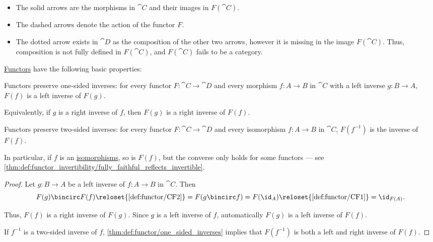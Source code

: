 \begin{example}
\begin{thmenum}
    \begin{itemize}
      \item The solid arrows are the morphisms in \( \cat{C} \) and their images in \( F(\cat{C}) \).
      \item The dashed arrows denote the action of the functor \( F \).
      \item The dotted arrow exists in \( \cat{D} \) as the composition of the other two arrows, however it is missing in the image \( F(\cat{C}) \). Thus, composition is not fully defined in \( F(\cat{C}) \), and \( F(\cat{C}) \) fails to be a category.
    \end{itemize}
  \end{thmenum}
\end{example}

\begin{proposition}\label{thm:def:functor}
  \hyperref[def:functor]{Functors} have the following basic properties:
  \begin{thmenum}
     Functors preserve one-sided inverses: for every functor \( F: \cat{C} \to \cat{D} \) and every morphism \( f: A \to B \) in \( \cat{C} \) with a left inverse \( g: B \to A \), \( F(f) \) is a left inverse of \( F(g) \).

    Equivalently, if \( g \) is a right inverse of \( f \), then \( F(g) \) is a right inverse of \( F(f) \).

     Functors preserve two-sided inverses: for every functor \( F: \cat{C} \to \cat{D} \) and every isomorphism \( f: A \to B \) in \( \cat{C} \), \( F(f^{-1}) \) is the inverse of \( F(f) \).

    In particular, if \( f \) is an \hyperref[def:morphism_invertibility/isomorphism]{isomorphisms}, so is \( F(f) \), but the converse only holds for some functors --- see \cref{thm:def:functor_invertibility/fully_faithful_reflects_invertible}.
  \end{thmenum}
\end{proposition}
\begin{proof}
   Let \( g: B \to A \) be a left inverse of \( f: A \to B \) in \( \cat{C} \). Then
  \begin{equation*}
    F(g) \bincirc F(f)
    \reloset {\ref{def:functor/CF2}} =
    F(g \bincirc f)
    =
    F(\id_A)
    \reloset {\ref{def:functor/CF1}} =
    \id_{F(A)}.
  \end{equation*}

  Thus, \( F(f) \) is a right inverse of \( F(g) \). Since \( g \) is a left inverse of \( f \), automatically \( F(g) \) is a left inverse of \( F(f) \).

   If \( f^{-1} \) is a two-sided inverse of \( f \), \cref{thm:def:functor/one_sided_inverses} implies that \( F(f^{-1}) \) is both a left and right inverse of \( F(f) \).
\end{proof}

